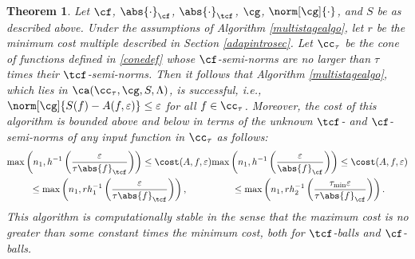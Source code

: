 \documentclass[]{elsarticle}
\newtheorem{theorem}{Theorem}
\theoremstyle{definition}
\theoremstyle{remark}
\newcommand{\Fnorm}[1]{\abs{#1}_{\cf}}
\newcommand{\Ftnorm}[1]{\abs{#1}_{\tcf}}
\newcommand{\Gnorm}[1]{\norm[\cg]{#1}}
\begin{document}
\begin{theorem}  \label{MultiStageThm}  Let $\cf$, $\Fnorm{\cdot}$, $\Ftnorm{\cdot}$, $\cg$, $\Gnorm{\cdot}$, and $S$ be as described above.  Under the assumptions of Algorithm \ref{multistagealgo}, let $r$ be the minimum cost multiple described in Section \ref{adapintrosec}.  
Let $\cc_\tau$ be the cone of functions defined in \eqref{conedef} whose $\cf$-semi-norms are no larger than $\tau$ times their $\tcf$-semi-norms.  
Then it follows that Algorithm \ref{multistagealgo}, which lies in $\ca(\cc_{\tau},\cg,S,\Lambda)$, is successful,  i.e.,  $\norm[\cg]{S(f)-A(f,\varepsilon)} \le \varepsilon$ for all $f \in \cc_\tau$.  Moreover, the cost of this algorithm is bounded above and below in terms of the unknown $\tcf$- and $\cf$-semi-norms of any input function in $\cc_{\tau}$ as follows:
\begin{subequations}  \label{automultistagedetcost}
\begin{multline}
\max \left(n_1, h^{-1}\left(\frac{\varepsilon}{\tau \Ftnorm{f}} \right) \right) \le 
\cost(A,f,\varepsilon) \\
\le \max \left(n_1, rh_1^{-1}\left(\frac{\varepsilon}{\tau \Ftnorm{f}} \right) \right),
\end{multline}
\begin{multline}
\max \left(n_1, h^{-1}\left(\frac{\varepsilon}{\Fnorm{f}} \right) \right) \le \cost(A,f,\varepsilon)\\
\le\max \left(n_1, rh_2^{-1}\left(\frac{\tau_{\min}\varepsilon}{\tau \Fnorm{f}} \right) \right).
\end{multline}
\end{subequations}
This algorithm is computationally stable in the sense that the maximum cost is no greater than some constant times the minimum cost, both for $\tcf$-balls and $\cf$-balls.
\end{theorem}
\end{document}
